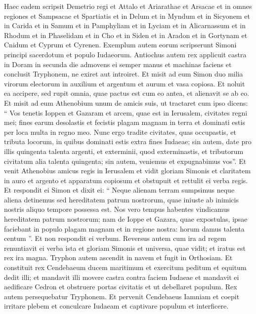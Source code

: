 \begin{biblechapter}
\begin{biblechapter}
\begin{biblechapter}
\begin{biblechapter}
\begin{biblechapter}
\begin{biblechapter}
\begin{biblechapter}
\begin{biblechapter}
\begin{biblechapter}
\begin{biblechapter}
\begin{biblechapter}
\begin{biblechapter}
\begin{biblechapter}
\begin{biblechapter}
\begin{biblechapter}
\verse Haec eadem scripsit Demetrio regi et Attalo et Ariarathae et Arsacae 
\verse et in omnes regiones et Sampsacae et Spartiatis et in Delum et in Myndum et in Sicyonem et in Carida et in Samum et in Pamphyliam et in Lyciam et in Alicarnassum et in Rhodum et in Phaselidam et in Cho et in Siden et in Aradon et in Gortynam et Cnidum et Cyprum et Cyrenen. 
 \verse Exemplum autem eorum scripserunt Simoni principi sacerdotum et populo Iudaeorum.
 \verse Antiochus autem rex applicuit castra in Doram in secunda die admovens ei semper manus et machinas faciens et conclusit Tryphonem, ne exiret aut introiret. 
\verse Et misit ad eum Simon duo milia virorum electorum in auxilium et argentum et aurum et vasa copiosa. 
\verse Et noluit ea accipere, sed rupit omnia, quae pactus est cum eo antea, et alienavit se ab eo. 
\verse Et misit ad eum Athenobium unum de amicis suis, ut tractaret cum ipso dicens: “ Vos tenetis Ioppen et Gazaram et arcem, quae est in Ierusalem, civitates regni mei; 
\verse fines earum desolastis et fecistis plagam magnam in terra et dominati estis per loca multa in regno meo. 
\verse Nunc ergo tradite civitates, quas occupastis, et tributa locorum, in quibus dominati estis extra fines Iudaeae; 
\verse sin autem, date pro illis quingenta talenta argenti, et exterminii, quod exterminastis, et tributorum civitatum alia talenta quingenta; sin autem, veniemus et expugnabimus vos”. 
\verse Et venit Athenobius amicus regis in Ierusalem et vidit gloriam Simonis et claritatem in auro et argento et apparatum copiosum et obstupuit et rettulit ei verba regis. 
\verse Et respondit ei Simon et dixit ei: “ Neque alienam terram sumpsimus neque aliena detinemus sed hereditatem patrum nostrorum, quae iniuste ab inimicis nostris aliquo tempore possessa est. 
\verse Nos vero tempus habentes vindicamus hereditatem patrum nostrorum; 
\verse nam de Ioppe et Gazara, quae expostulas, ipsae faciebant in populo plagam magnam et in regione nostra: horum damus talenta centum ”. Et non respondit ei verbum. 
\verse Reversus autem cum ira ad regem renuntiavit ei verba ista et gloriam Simonis et universa, quae vidit; et iratus est rex ira magna. 
\verse Tryphon autem ascendit in navem et fugit in Orthosiam.
 \verse Et constituit rex Cendebaeum ducem maritimum et exercitum peditum et equitum dedit illi; 
\verse et mandavit illi movere castra contra faciem Iudaeae et mandavit ei aedificare Cedron et obstruere portas civitatis et ut debellaret populum. Rex autem persequebatur Tryphonem. 
\verse Et pervenit Cendebaeus Iamniam et coepit irritare plebem et conculcare Iudaeam et captivare populum et interficere. 

\end{biblechapter}
\end{biblechapter}
\end{biblechapter}
\end{biblechapter}
\end{biblechapter}
\end{biblechapter}
\end{biblechapter}
\end{biblechapter}
\end{biblechapter}
\end{biblechapter}
\end{biblechapter}
\end{biblechapter}
\end{biblechapter}
\end{biblechapter}
\end{biblechapter}
